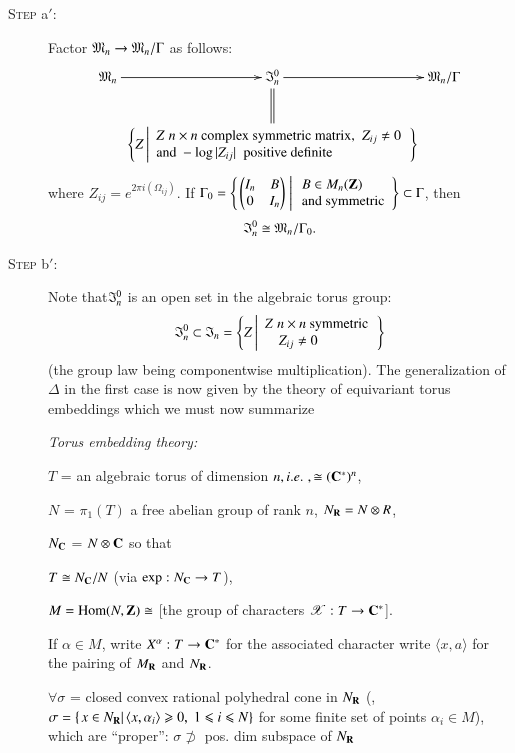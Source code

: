 \begin{description}
\item[\textsc{Step} a$'$:] Factor $\mathfrak{M}_n \to \mathfrak{M}_n / \Gamma$ as follows:
$$
\xymatrix@C=0.05cm{
\fM_n \ar[r]  &\fI^0_n \ar@{=}[d] \ar[r] &  \fM_n / \Gamma\\
& \left\{ Z  \left| 
\begin{array}{l}
Z \; n \times n \text{ complex symmetric matrix, } \; Z_{ij} \neq 0 \tabularnewline
\text{and } -\log |Z_{ij}| \; \text{ positive definite}
\end{array} 
\right.
\right\} & 
}
$$
where $Z_{ij} = e^{2\pi i(\Omega_{ij})}$. If $\Gamma_0 = \left\{ \left. \begin{pmatrix}I_n & B \\ 0 & I_n \end{pmatrix}\; \right| 
\begin{array}{l}
B \in M_n (\mathbf{Z})\\
\text{and symmetric}
\end{array}
 \right\} \subset \Gamma$, then
$$
\mathfrak{I}^0_n \cong \mathfrak{M}_n /\Gamma_0.
$$

\item[\textsc{Step} b$'$:] Note that\pageoriginale $\mathfrak{I}^0_n$ is an open set in the algebraic torus group:
$$
\mathfrak{I}^0_n \subset \mathfrak{I}_n = 
\left\{Z \left|\begin{array}{l}
Z \; n \times n \text{ symmetric}\\
\quad Z_{ij} \neq 0
\end{array}
\right. \right\}
$$
(the group law being componentwise multiplication). The generalization of $\Delta$ in the first case is now given by the theory of equivariant torus embeddings which we must now summarize

\noindent
\textit{Torus embedding theory:}

$T$ = an algebraic torus of dimension $n, {i.e.}\kern.3em, \cong (\mathbf{C}^\ast)^n$,

$N$ = $\pi_1 (T)$ a free abelian group of rank $n$, $N_{\mathbf{R}} = N\otimes R$, 

$N_{\mathbf{C}}$ = $N \otimes \mathbf{C}$ so that 

$T \cong N_{\mathbf{C}} / N$ (via $\exp : N_{\mathbf{C}} \to T$),

$M = \operatorname{Hom} (N , \mathbf{Z}) \cong$ [the group of characters $\mathscr{X}: T \to \mathbf{C}^\ast$].

If $\alpha \in M$, write $X^\alpha: T \to \mathbf{C}^\ast$ for the associated character write $\langle x, a\rangle$ for the pairing of $M_{\mathbf{R}}$ and $N_{\mathbf{R}}$.

$\forall \sigma$ = closed convex rational polyhedral cone in $N_{\mathbf{R}}$ (\ie, $\sigma = \{\left. x \in N_{\mathbf{R}} \right| \langle x, \alpha_i \rangle \geqslant 0, \; 1 \leqslant i \leqslant N\}$ for some finite set of points $\alpha_i \in M$), which are ``proper'': $\sigma \not\supset$ pos. dim subspace of $N_{\mathbf{R}}$


\end{description}
